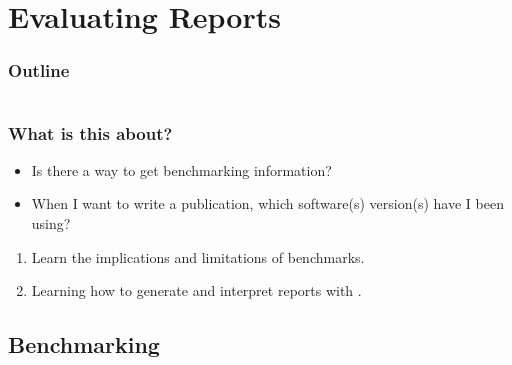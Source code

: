 \section{Evaluating Reports}

\begin{frame}
    \frametitle{Outline}
    \begin{columns}[t]
        \begin{column}{.5\textwidth}
            \tableofcontents[sections={1-9},currentsection]
        \end{column}
        \begin{column}{.5\textwidth}
            \tableofcontents[sections={10-18},currentsection]
        \end{column}
    \end{columns}
\end{frame}

\begin{frame}
  \frametitle{What is this about?}
   \begin{question}[Questions]
   	 \begin{itemize}
        \item Is there a way to get benchmarking information?
        \item When I want to write a publication, which software(s) version(s) have I been using?
     \end{itemize}
   \end{question}
   \begin{docs}[Objectives]
   	  \begin{enumerate}
         \item Learn the implications and limitations of benchmarks.
         \item Learning how to generate and interpret reports with \Snakemake{}.
      \end{enumerate}
  \end{docs}
\end{frame}

\subsection{Benchmarking}

